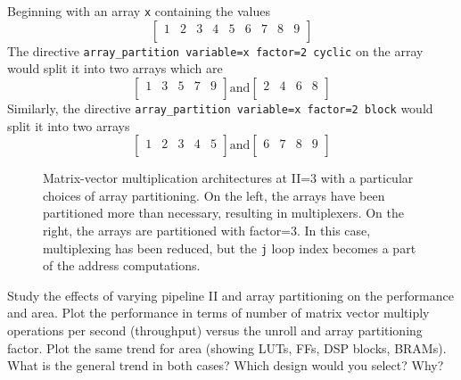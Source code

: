 \begin{aside}
Beginning with an array \lstinline|x| containing the values \[ 
\begin{bmatrix} 
1 & 2 & 3 & 4 & 5 & 6 & 7 & 8 & 9\\
\end{bmatrix}
\]
The directive \lstinline{array_partition variable=x factor=2 cyclic} on the array would split it into two arrays which are 
\[\begin{bmatrix}
1 & 3 & 5 & 7 & 9\\
\end{bmatrix} \text{and} 
\begin{bmatrix}
2 & 4 & 6 & 8 \\
\end{bmatrix}
\]
Similarly, the directive \lstinline{array_partition variable=x factor=2 block} would split it into two arrays
\[\begin{bmatrix}
1 & 2 & 3 & 4 & 5\\
\end{bmatrix} \text{and} 
\begin{bmatrix}
6 & 7 & 8 & 9 \\
\end{bmatrix}
\]
\end{aside}

\begin{figure}

\caption{Matrix-vector multiplication architectures at II=3 with a particular choices of array partitioning.  On the left, the arrays have been partitioned more than necessary, resulting in multiplexers.  On the right, the arrays are partitioned with factor=3. In this case, multiplexing has been reduced, but the \lstinline|j| loop index becomes a part of the address computations.}
\label{fig:matrix_vector_partition_factor}
\end{figure}

\begin{exercise}
Study the effects of varying pipeline II and array partitioning on the performance and area. Plot the performance in terms of number of matrix vector multiply operations per second (throughput) versus the unroll and array partitioning factor. Plot the same trend for area (showing LUTs, FFs, DSP blocks, BRAMs). What is the general trend in both cases? Which design would you select? Why?
\end{exercise} 

